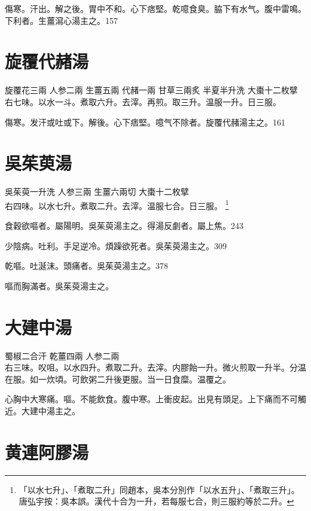 傷寒。汗出。解之後。胃中不和。心下痞堅。乾噫食臭。脇下有水气。腹中雷鳴。下利者。生薑瀉心湯主之。157

\section{旋覆代赭湯}

旋覆花{\scriptsize 三兩} 人参{\scriptsize 二兩} 生薑{\scriptsize 五兩} 代赭{\scriptsize 一兩} 甘草{\scriptsize 三兩炙} 半夏{\scriptsize 半升洗} 大棗{\scriptsize 十二枚擘}\\
右七味。以水一斗。煮取六升。去滓。再煎。取三升。温服一升。日三服。

傷寒。发汗{\khaaitp 或}吐{\khaaitp 或}下。解後。心下痞堅。噫气不除者。旋覆代赭湯主之。161

\section{吳茱萸湯}

吳茱萸{\scriptsize 一升{\khaaitp 洗}} 人参{\scriptsize 三兩} 生薑{\scriptsize 六兩切} 大棗{\scriptsize 十二枚擘}\\
右四味。以水七升。煮取二升。去滓。温服七合。日三服。{\zhaoben}
	\footnote{
		「以水七升」、「煮取二升」同趙本，吳本分別作「以水五升」、「煮取三升」。唐弘宇按：吳本誤。漢代十合为一升，若每服七合，則三服約等於二升。
	}

食穀欲嘔者。屬陽明。{\khaaitp 吳}茱萸湯主之。得湯反劇者。屬上焦。243

少陰病。吐利。手足逆{\khaaitp 冷}。煩躁欲死者。{\khaaitp 吳}茱萸湯主之。309

乾嘔。吐涎沫。頭痛者。{\khaaitp 吳}茱萸湯主之。378

嘔而胸滿者。{\khaaitp 吳}茱萸湯主之。

\section{大建中湯}

蜀椒{\scriptsize 二合汗} 乾薑{\scriptsize 四兩} 人参{\scriptsize 二兩}\\
右三味。{\khaaitp 㕮咀。}以水四升。煮取二升。去滓。内膠飴一升。微火煎取一升半。分温在服。如一炊頃。可飲粥二升後更服。当一日食糜。温覆之。

心胸中大寒痛。嘔。不能飲食。腹中寒。上衝皮起。出見有頭足。上下痛而不可觸近。大建中湯主之。

\section{黄連阿膠湯}

